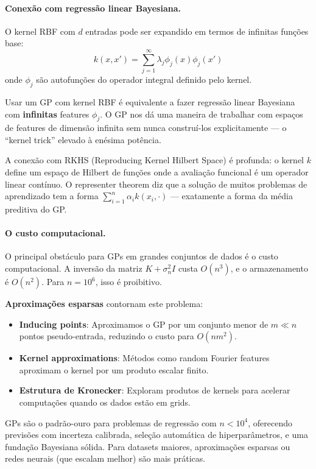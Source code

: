 \documentclass{tufte-handout}
\begin{document}
\paragraph{Conexão com regressão linear Bayesiana.}

O kernel RBF com $d$ entradas pode ser expandido em termos de infinitas funções base:
\[
k(x, x') = \sum_{j=1}^\infty \lambda_j \phi_j(x) \phi_j(x')
\]
onde $\phi_j$ são autofunções do operador integral definido pelo kernel.

Usar um GP com kernel RBF é equivalente a fazer regressão linear Bayesiana com \textbf{infinitas} features $\phi_j$. O GP nos dá uma maneira de trabalhar com espaços de features de dimensão infinita sem nunca construí-los explicitamente --- o ``kernel trick'' elevado à enésima potência.

\begin{remark}
    A conexão com RKHS (Reproducing Kernel Hilbert Space) é profunda: o kernel $k$ define um espaço de Hilbert de funções onde a avaliação funcional é um operador linear contínuo. O representer theorem diz que a solução de muitos problemas de aprendizado tem a forma $\sum_{i=1}^n \alpha_i k(x_i, \cdot)$ --- exatamente a forma da média preditiva do GP.
\end{remark}

\paragraph{O custo computacional.}

O principal obstáculo para GPs em grandes conjuntos de dados é o custo computacional. A inversão da matriz $K + \sigma_n^2 I$ custa $O(n^3)$, e o armazenamento é $O(n^2)$. Para $n = 10^6$, isso é proibitivo.

\textbf{Aproximações esparsas} contornam este problema:
\begin{itemize}
    \item \textbf{Inducing points}: Aproximamos o GP por um conjunto menor de $m \ll n$ pontos pseudo-entrada, reduzindo o custo para $O(n m^2)$.
    \item \textbf{Kernel approximations}: Métodos como random Fourier features aproximam o kernel por um produto escalar finito.
    \item \textbf{Estrutura de Kronecker}: Exploram produtos de kernels para acelerar computações quando os dados estão em grids.
\end{itemize}

\begin{remark}
    GPs são o padrão-ouro para problemas de regressão com $n < 10^4$, oferecendo previsões com incerteza calibrada, seleção automática de hiperparâmetros, e uma fundação Bayesiana sólida. Para datasets maiores, aproximações esparsas ou redes neurais (que escalam melhor) são mais práticas.
\end{remark}
\end{document}
